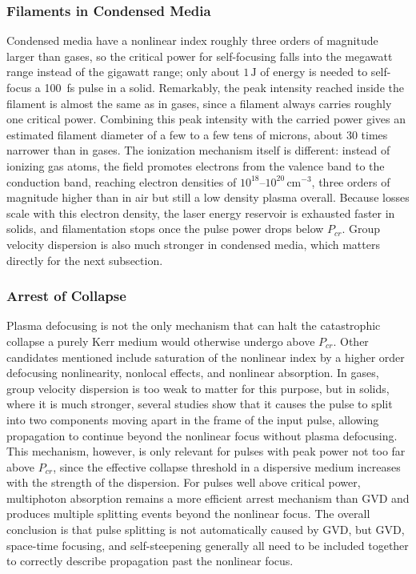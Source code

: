 \documentclass[11pt,a4paper]{article}
\begin{document}
\subsubsection{Filaments in Condensed Media}
Condensed media have a nonlinear index roughly three orders of magnitude larger than gases, so the critical power for self-focusing falls into the megawatt range instead of the gigawatt range; only about $1\,\text{J}$ of energy is needed to self-focus a 100~fs pulse in a solid. Remarkably, the peak intensity reached inside the filament is almost the same as in gases, since a filament always carries roughly one critical power. Combining this peak intensity with the carried power gives an estimated filament diameter of a few to a few tens of microns, about 30 times narrower than in gases. The ionization mechanism itself is different: instead of ionizing gas atoms, the field promotes electrons from the valence band to the conduction band, reaching electron densities of $10^{18}$--$10^{20}\,\text{cm}^{-3}$, three orders of magnitude higher than in air but still a low density plasma overall. Because losses scale with this electron density, the laser energy reservoir is exhausted faster in solids, and filamentation stops once the pulse power drops below $P_{cr}$. Group velocity dispersion is also much stronger in condensed media, which matters directly for the next subsection.

\subsubsection{Arrest of Collapse}
Plasma defocusing is not the only mechanism that can halt the catastrophic collapse a purely Kerr medium would otherwise undergo above $P_{cr}$. Other candidates mentioned include saturation of the nonlinear index by a higher order defocusing nonlinearity, nonlocal effects, and nonlinear absorption. In gases, group velocity dispersion is too weak to matter for this purpose, but in solids, where it is much stronger, several studies show that it causes the pulse to split into two components moving apart in the frame of the input pulse, allowing propagation to continue beyond the nonlinear focus without plasma defocusing. This mechanism, however, is only relevant for pulses with peak power not too far above $P_{cr}$, since the effective collapse threshold in a dispersive medium increases with the strength of the dispersion. For pulses well above critical power, multiphoton absorption remains a more efficient arrest mechanism than GVD and produces multiple splitting events beyond the nonlinear focus. The overall conclusion is that pulse splitting is not automatically caused by GVD, but GVD, space-time focusing, and self-steepening generally all need to be included together to correctly describe propagation past the nonlinear focus.
\end{document}
